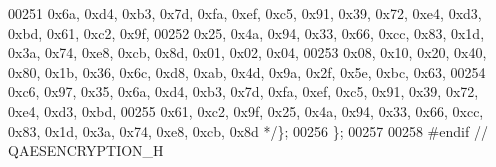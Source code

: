 \begin{DoxyCode}
00251 \textcolor{comment}{        0x6a, 0xd4, 0xb3, 0x7d, 0xfa, 0xef, 0xc5, 0x91, 0x39, 0x72, 0xe4, 0xd3, 0xbd, 0x61, 0xc2, 0x9f,}
00252 \textcolor{comment}{        0x25, 0x4a, 0x94, 0x33, 0x66, 0xcc, 0x83, 0x1d, 0x3a, 0x74, 0xe8, 0xcb, 0x8d, 0x01, 0x02, 0x04,}
00253 \textcolor{comment}{        0x08, 0x10, 0x20, 0x40, 0x80, 0x1b, 0x36, 0x6c, 0xd8, 0xab, 0x4d, 0x9a, 0x2f, 0x5e, 0xbc, 0x63,}
00254 \textcolor{comment}{        0xc6, 0x97, 0x35, 0x6a, 0xd4, 0xb3, 0x7d, 0xfa, 0xef, 0xc5, 0x91, 0x39, 0x72, 0xe4, 0xd3, 0xbd,}
00255 \textcolor{comment}{            0x61, 0xc2, 0x9f, 0x25, 0x4a, 0x94, 0x33, 0x66, 0xcc, 0x83, 0x1d, 0x3a, 0x74, 0xe8, 0xcb, 0x8d 
      */}\};
00256 \};
00257 
00258 \textcolor{preprocessor}{#endif // QAESENCRYPTION\_H}
\end{DoxyCode}
